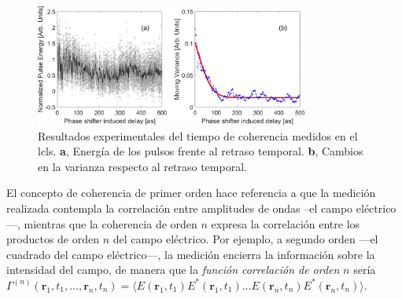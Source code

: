 \begin{figure}[htpb]
  \centering
  \includegraphics[width=0.8\textwidth]{Figuras/ch1_coher.png}
  \caption{Resultados experimentales del tiempo de coherencia medidos en el \acrshort{lcls}\autocite{Zhou2020}. \textbf{a}, Energía de los pulsos frente al retraso temporal. \textbf{b}, Cambios en la varianza respecto al retraso temporal.}
  \label{fig:ch1_coher}
\end{figure}

El concepto de coherencia de primer orden hace referencia a que la medición realizada contempla la correlación entre amplitudes de ondas --el campo eléctrico---, mientras que la coherencia de orden $n$ expresa la correlación entre los productos de orden $n$ del campo eléctrico. Por ejemplo, a segundo orden ---el cuadrado del campo eléctrico---, la medición encierra la información sobre la intensidad del campo, de manera que la \emph{función correlación de orden} $n$ sería $\Gamma^{(n)}(\symbf{r}_1,t_1,\ldots,\symbf{r}_n,t_n) = \langle E(\symbf{r}_1,t_1)E^{*}(\symbf{r}_1,t_1)\ldots E(\symbf{r}_n,t_n)E^{*}(\symbf{r}_n,t_n)\rangle$.

